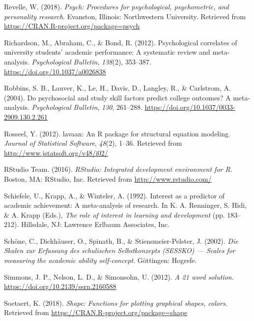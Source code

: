 \documentclass[
  man]{apa6}
\newlength{\cslhangindent}
\newlength{\cslentryspacingunit} %
\newenvironment{CSLReferences}[2] %
 {%
  \setlength{\parindent}{0pt}
  \ifodd #1
  \let\oldpar\par
  \def\par{\hangindent=\cslhangindent\oldpar}
  \fi
  \setlength{\parskip}{#2\cslentryspacingunit}
 }%
 {}
\begin{document}
\begin{CSLReferences}{1}{0}
\leavevmode{}%
Revelle, W. (2018). \emph{Psych: Procedures for psychological, psychometric, and personality research}. Evanston, Illinois: Northwestern University. Retrieved from \url{https://CRAN.R-project.org/package=psych}

\leavevmode{}%
Richardson, M., Abraham, C., \& Bond, R. (2012). Psychological correlates of university students' academic performance: A systematic review and meta-analysis. \emph{Psychological Bulletin}, \emph{138}(2), 353--387. \url{https://doi.org/10.1037/a0026838}

\leavevmode{}%
Robbins, S. B., Lauver, K., Le, H., Davis, D., Langley, R., \& Carlstrom, A. (2004). Do psychosocial and study skill factors predict college outcomes? A meta-analysis. \emph{Psychological Bulletin}, \emph{130}, 261--288. \url{https://doi.org/10.1037/0033-2909.130.2.261}

\leavevmode{}%
Rosseel, Y. (2012). {lavaan}: An {R} package for structural equation modeling. \emph{Journal of Statistical Software}, \emph{48}(2), 1--36. Retrieved from \url{http://www.jstatsoft.org/v48/i02/}

\leavevmode{}%
RStudio Team. (2016). \emph{RStudio: Integrated development environment for {R}}. Boston, MA: RStudio, Inc. Retrieved from \url{http://www.rstudio.com/}

\leavevmode{}%
Schiefele, U., Krapp, A., \& Winteler, A. (1992). Interest as a predictor of academic achievement: A meta-analysis of research. In K. A. Renninger, S. Hidi, \& A. Krapp (Eds.), \emph{The role of interest in learning and development} (pp. 183--212). Hillsdale, NJ: Lawrence Erlbaum Associates, Inc.

\leavevmode{}%
Schöne, C., Dickhäuser, O., Spinath, B., \& Stiensmeier-Pelster, J. (2002). \emph{{Die Skalen zur Erfassung des schulischen Selbstkonzepts (SESSKO) --- Scales for measuring the academic ability self-concept}}. G{ö}ttingen: Hogrefe.

\leavevmode{}%
Simmons, J. P., Nelson, L. D., \& Simonsohn, U. (2012). \emph{A 21 word solution}. \url{https://doi.org/10.2139/ssrn.2160588}

\leavevmode{}%
Soetaert, K. (2018). \emph{Shape: Functions for plotting graphical shapes, colors}. Retrieved from \url{https://CRAN.R-project.org/package=shape}


\end{CSLReferences}
\end{document}
